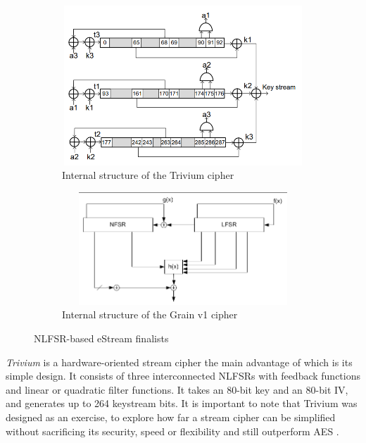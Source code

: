 \begin{figure}[h]
	\vspace{0.2cm}
	\begin{subfigure}{0.5\textwidth}
		\includegraphics[width=1\textwidth,height=170pt]{img/trivium.png} 
		\vspace{5pt}
		\caption{Internal structure of the Trivium cipher \cite{potestad2020breaking}}
		\label{fig:trivium}
	\end{subfigure}
	\begin{subfigure}{0.5\textwidth}
		\vspace{25pt}
		\includegraphics[width=1\textwidth,height=120pt]{img/grainv1.png} 
		\vspace{29pt}
		\caption{Internal structure of the Grain v1 cipher \cite{grainImage}}
		\label{fig:grainv1}
	\end{subfigure}
	
	\caption{NLFSR-based eStream finalists}
	\label{fig:NLFSR}
	\vspace{0.3cm}
\end{figure}

\emph{Trivium} is a hardware-oriented stream cipher the main advantage of which is its simple design. It consists of three interconnected NLFSRs with feedback functions and linear or quadratic filter functions. It takes an 80-bit key and an 80-bit IV, and generates up to 264 keystream bits. It is important to note that Trivium was designed as an exercise, to explore how far a stream cipher can be simplified without sacrificing its security, speed or flexibility and still outperform AES \cite{canniere2008trivium}.\\

